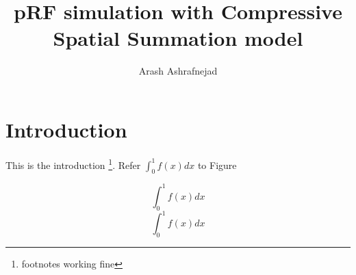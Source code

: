 \documentclass[]{article}
\title{pRF simulation with Compressive Spatial Summation model}
\author{Arash Ashrafnejad}
\begin{document}
\maketitle
\newpage


\section{Introduction}
This is the introduction \footnote{footnotes working fine}. Refer $\int_{0}^{1} f(x) dx$ to Figure \cite{Kay2013}

\begin{equation}
	\int_{0}^{1} f(x) dx
\end{equation}
\begin{equation}
\int_{0}^{1} f(x) dx
\end{equation}
\end{document}

